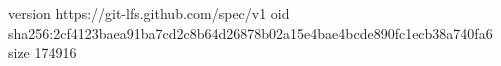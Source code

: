 version https://git-lfs.github.com/spec/v1
oid sha256:2cf4123baea91ba7cd2c8b64d26878b02a15e4bae4bcde890fc1ecb38a740fa6
size 174916
